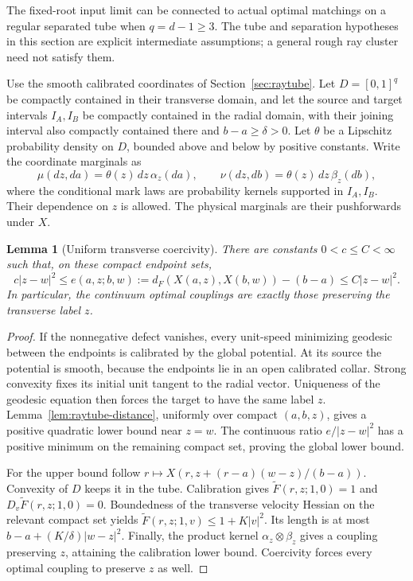 \documentclass[11pt,reqno]{amsart}
\newtheorem{lemma}[theorem]{Lemma}
\theoremstyle{definition}
\theoremstyle{remark}
\numberwithin{equation}{section}
\begin{document}
The fixed-root input limit can be connected to actual optimal
matchings on a regular separated tube when \(q=d-1\ge3\).
The tube and separation hypotheses in this section are explicit
intermediate assumptions; a general rough ray cluster need not
satisfy them.

Use the smooth calibrated coordinates of Section~\ref{sec:raytube}.
Let \(D=[0,1]^q\) be compactly contained in their transverse domain,
and let the source and target intervals \(I_A,I_B\) be compactly
contained in the radial domain, with their joining interval also
compactly contained there and \(b-a\ge\delta>0\).
Let \(\theta\) be a Lipschitz probability density on \(D\), bounded
above and below by positive constants. Write the coordinate marginals as
\[
\mu(dz,da)=\theta(z)\,dz\,\alpha_z(da),\qquad
\nu(dz,db)=\theta(z)\,dz\,\beta_z(db),
\]
where the conditional mark laws are probability kernels supported in
\(I_A,I_B\). Their dependence on \(z\) is allowed.
The physical marginals are their pushforwards under \(X\).

\begin{lemma}[Uniform transverse coercivity]
\label{lem:highd-coercivity}
There are constants \(0<c\le C<\infty\) such that, on these compact
endpoint sets,
\[
c|z-w|^2\le
 e(a,z;b,w):=d_F(X(a,z),X(b,w))-(b-a)
 \le C|z-w|^2.
\]
In particular, the continuum optimal couplings are exactly those
preserving the transverse label \(z\).
\end{lemma}

\begin{proof}
If the nonnegative defect vanishes, every unit-speed minimizing
geodesic between the endpoints is calibrated by the global potential.
At its source the potential is smooth, because the endpoints lie in
an open calibrated collar. Strong convexity fixes its initial unit
tangent to the radial vector. Uniqueness of the geodesic equation then
forces the target to have the same label \(z\).
Lemma~\ref{lem:raytube-distance}, uniformly over compact \((a,b,z)\),
gives a positive quadratic lower bound near \(z=w\). The continuous
ratio \(e/|z-w|^2\) has a positive minimum on the remaining compact
set, proving the global lower bound.

For the upper bound follow
\(r\mapsto X(r,z+(r-a)(w-z)/(b-a))\).
Convexity of \(D\) keeps it in the tube. Calibration gives
\(\widetilde F(r,z;1,0)=1\) and
\(D_v\widetilde F(r,z;1,0)=0\). Boundedness of the transverse
velocity Hessian on the relevant compact set yields
\(\widetilde F(r,z;1,v)\le1+K|v|^2\).
Its length is at most \(b-a+(K/\delta)|w-z|^2\).
Finally, the product kernel \(\alpha_z\otimes\beta_z\) gives a
coupling preserving \(z\), attaining the calibration lower bound.
Coercivity forces every optimal coupling to preserve \(z\) as well.
\end{proof}
\end{document}
